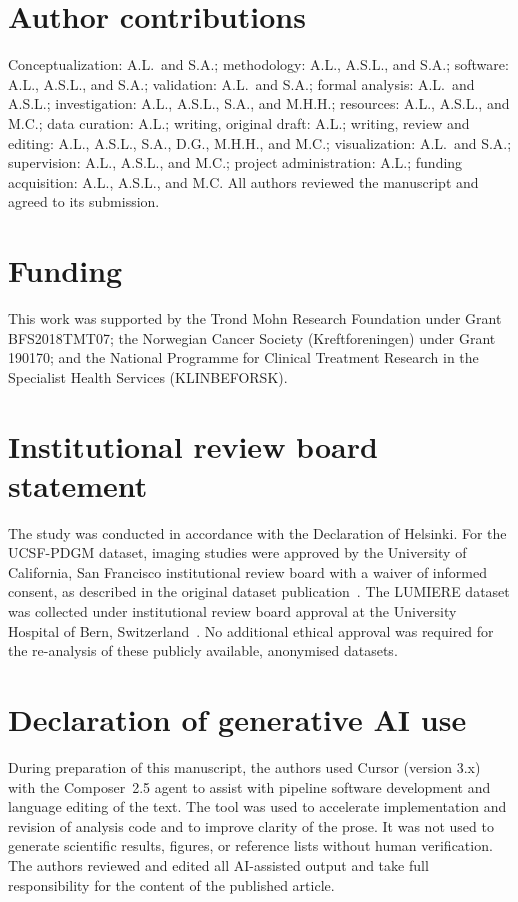\documentclass[a4paper,11pt,leqno]{article}
\begin{document}
\section*{Author contributions}
Conceptualization: A.L.\ and S.A.; methodology: A.L., A.S.L., and S.A.; software: A.L., A.S.L., and S.A.; validation: A.L.\ and S.A.; formal analysis: A.L.\ and A.S.L.; investigation: A.L., A.S.L., S.A., and M.H.H.; resources: A.L., A.S.L., and M.C.; data curation: A.L.; writing, original draft: A.L.; writing, review and editing: A.L., A.S.L., S.A., D.G., M.H.H., and M.C.; visualization: A.L.\ and S.A.; supervision: A.L., A.S.L., and M.C.; project administration: A.L.; funding acquisition: A.L., A.S.L., and M.C. All authors reviewed the manuscript and agreed to its submission.

\section*{Funding}
This work was supported by the Trond Mohn Research Foundation under Grant BFS2018TMT07; the Norwegian Cancer Society (Kreftforeningen) under Grant 190170; and the National Programme for Clinical Treatment Research in the Specialist Health Services (KLINBEFORSK).

\section*{Institutional review board statement}
The study was conducted in accordance with the Declaration of Helsinki. For the UCSF-PDGM dataset, imaging studies were approved by the University of California, San Francisco institutional review board with a waiver of informed consent, as described in the original dataset publication~\cite{Calabrese2022b}. The LUMIERE dataset was collected under institutional review board approval at the University Hospital of Bern, Switzerland~\cite{Suter2022}. No additional ethical approval was required for the re-analysis of these publicly available, anonymised datasets.

\section*{Declaration of generative AI use}
During preparation of this manuscript, the authors used Cursor (version 3.x) with the Composer~2.5 agent to assist with pipeline software development and language editing of the text. The tool was used to accelerate implementation and revision of analysis code and to improve clarity of the prose. It was not used to generate scientific results, figures, or reference lists without human verification. The authors reviewed and edited all AI-assisted output and take full responsibility for the content of the published article.
\end{document}
